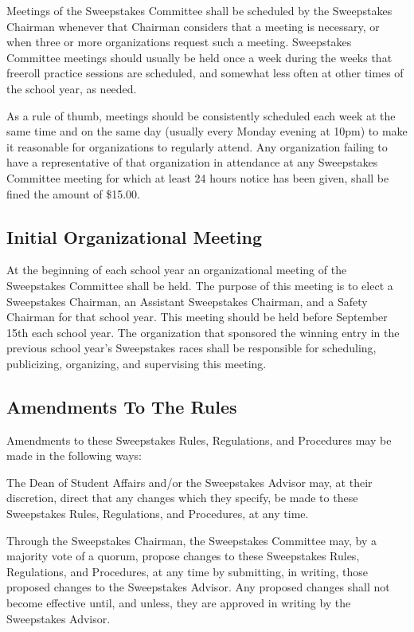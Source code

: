 Meetings of the Sweepstakes Committee shall be scheduled by the Sweepstakes Chairman whenever that Chairman considers that a meeting is necessary, or when three or more organizations request such a meeting. Sweepstakes Committee meetings should usually be held once a week during the weeks that freeroll practice sessions are scheduled, and somewhat less often at other times of the school year, as needed.

As a rule of thumb, meetings should be consistently scheduled each week at the same time and on the same day (usually every Monday evening at 10pm) to make it reasonable for organizations to regularly attend. Any organization failing to have a representative of that organization in attendance at any Sweepstakes Committee meeting for which at least 24 hours notice has been given, shall be fined the amount of \$15.00.

\subsection{Initial Organizational Meeting}

At the beginning of each school year an organizational meeting of the Sweepstakes Committee shall be held. The purpose of this meeting is to elect a Sweepstakes Chairman, an Assistant Sweepstakes Chairman, and a Safety Chairman for that school year. This meeting should be held before September 15th each school year. The organization that sponsored the winning entry in the previous school year's Sweepstakes races shall be responsible for scheduling, publicizing, organizing, and supervising this meeting.

\subsection{Amendments To The Rules}

Amendments to these Sweepstakes Rules, Regulations, and Procedures may be made in the following ways:

The Dean of Student Affairs and/or the Sweepstakes Advisor may, at their discretion, direct that any changes which they specify, be made to these Sweepstakes Rules, Regulations, and Procedures, at any time.

Through the Sweepstakes Chairman, the Sweepstakes Committee may, by a majority vote of a quorum, propose changes to these Sweepstakes Rules, Regulations, and Procedures, at any time by submitting, in writing, those proposed changes to the Sweepstakes Advisor. Any proposed changes shall not become effective until, and unless, they are approved in writing by the Sweepstakes Advisor.

